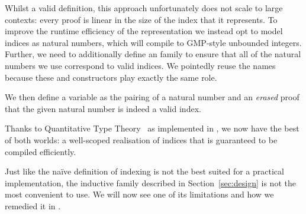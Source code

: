 Whilst a valid definition, this approach unfortunately does not scale to
large contexts:
%
every  proof is linear in the size of the \DeBruijn{}
index that it represents.
%
To improve the runtime efficiency of the representation we instead opt to
model \DeBruijn{} indices as natural numbers, which \Idris{} will compile to
GMP-style unbounded integers.
%
Further, we need to additionally define an  family to ensure that
all of the natural numbers we use correspond to valid indices.
%
We pointedly reuse the  names because these 
and  constructors play exactly the same role.


\noindent
We then define a variable as the pairing of a natural number and an \emph{erased}
proof that the given natural number is indeed a valid \DeBruijn{} index.


Thanks to Quantitative Type Theory~\cite{DBLP:conf/birthday/McBride16,DBLP:conf/lics/Atkey18}
as implemented in \Idris{},
we now have the best of both worlds: a well-scoped realisation of \DeBruijn{} indices
that is guaranteed to be compiled efficiently.


Just like the naïve definition of \DeBruijn{} indexing is not the
best suited for a practical implementation,
the inductive family  described in Section~\ref{sec:design}
is not the most convenient to use.
%
We will now see one of its limitations and how we remedied it in
\Velo{}.

